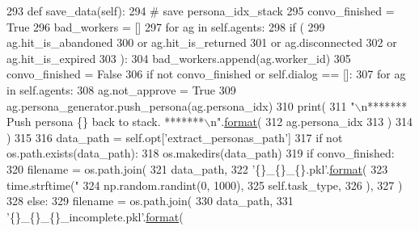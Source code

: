 \begin{DoxyCode}
293     \textcolor{keyword}{def }save\_data(self):
294         \textcolor{comment}{# save persona\_idx\_stack}
295         convo\_finished = \textcolor{keyword}{True}
296         bad\_workers = []
297         \textcolor{keywordflow}{for} ag \textcolor{keywordflow}{in} self.agents:
298             \textcolor{keywordflow}{if} (
299                 ag.hit\_is\_abandoned
300                 \textcolor{keywordflow}{or} ag.hit\_is\_returned
301                 \textcolor{keywordflow}{or} ag.disconnected
302                 \textcolor{keywordflow}{or} ag.hit\_is\_expired
303             ):
304                 bad\_workers.append(ag.worker\_id)
305                 convo\_finished = \textcolor{keyword}{False}
306         \textcolor{keywordflow}{if} \textcolor{keywordflow}{not} convo\_finished \textcolor{keywordflow}{or} self.dialog == []:
307             \textcolor{keywordflow}{for} ag \textcolor{keywordflow}{in} self.agents:
308                 ag.not\_approve = \textcolor{keyword}{True}
309                 ag.persona\_generator.push\_persona(ag.persona\_idx)
310                 print(
311                     \textcolor{stringliteral}{"\(\backslash\)n******* Push persona \{\} back to stack. *******\(\backslash\)n"}.\hyperlink{namespaceparlai_1_1chat__service_1_1services_1_1messenger_1_1shared__utils_a32e2e2022b824fbaf80c747160b52a76}{format}(
312                         ag.persona\_idx
313                     )
314                 )
315 
316         data\_path = self.opt[\textcolor{stringliteral}{'extract\_personas\_path'}]
317         \textcolor{keywordflow}{if} \textcolor{keywordflow}{not} os.path.exists(data\_path):
318             os.makedirs(data\_path)
319         \textcolor{keywordflow}{if} convo\_finished:
320             filename = os.path.join(
321                 data\_path,
322                 \textcolor{stringliteral}{'\{\}\_\{\}\_\{\}.pkl'}.\hyperlink{namespaceparlai_1_1chat__service_1_1services_1_1messenger_1_1shared__utils_a32e2e2022b824fbaf80c747160b52a76}{format}(
323                     time.strftime(\textcolor{stringliteral}{"%
324                     np.random.randint(0, 1000),
325                     self.task\_type,
326                 ),
327             )
328         \textcolor{keywordflow}{else}:
329             filename = os.path.join(
330                 data\_path,
331                 \textcolor{stringliteral}{'\{\}\_\{\}\_\{\}\_incomplete.pkl'}.\hyperlink{namespaceparlai_1_1chat__service_1_1services_1_1messenger_1_1shared__utils_a32e2e2022b824fbaf80c747160b52a76}{format}(
}
\end{DoxyCode}
